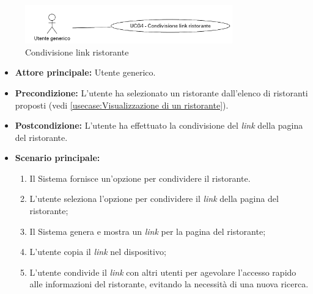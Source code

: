 \newpage
{}
\label{usecase:Condivisione link del ristorante}

\begin{figure}[h]
	\centering
	\includegraphics[width=0.8\textwidth]{./uml/UCG4.png} 
	\caption{Condivisione link ristorante}
	\label{fig:UCG4}
  \end{figure}

\begin{itemize}
	\item \textbf{Attore principale:} Utente generico.


	\item \textbf{Precondizione:}
	      L'utente ha selezionato un ristorante dall'elenco di ristoranti
	      proposti (vedi \autoref{usecase:Visualizzazione di un ristorante}).

	\item \textbf{Postcondizione:}
	      L'utente ha effettuato la condivisione del \textit{link} della pagina del ristorante.

	\item \textbf{Scenario principale:}
	      \begin{enumerate}
		      \item Il Sistema fornisce un'opzione per condividere il ristorante.
		      \item L'utente seleziona l'opzione per condividere il \textit{link} della pagina del ristorante;
		      \item Il Sistema genera e mostra un \textit{link} per la pagina del ristorante;
		      \item L'utente copia il \textit{link} nel dispositivo;
		      \item L'utente condivide il \textit{link} con altri utenti per agevolare l'accesso rapido alle
		            informazioni del ristorante, evitando la necessità di una nuova ricerca.
	      \end{enumerate}
\end{itemize}

